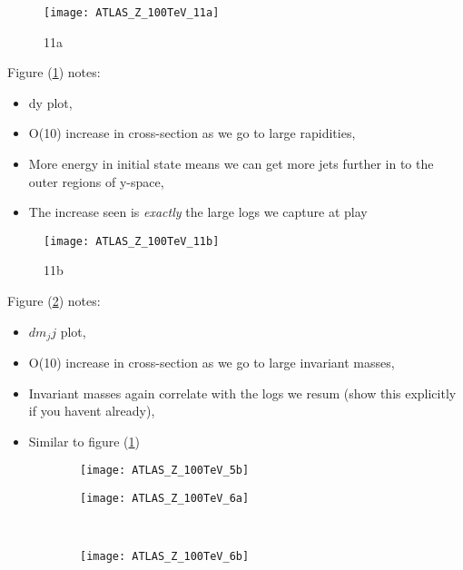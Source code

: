 	\begin{figure}[h]
		\centering
		\texttt{[image: ATLAS\_Z\_100TeV\_11a]}
		\caption{11a}
		\label{fig:100tev_11a}
	\end{figure}

	Figure (\ref{fig:100tev_11a}) notes:

	\begin{itemize}
		\item dy plot,
		\item O(10) increase in cross-section as we go to large rapidities,
		\item More energy in initial state means we can get more jets further in to the outer regions of y-space,
		\item The increase seen is \emph{exactly} the large logs we capture at play
	\end{itemize}

	\begin{figure}[h]
		\centering
		\texttt{[image: ATLAS\_Z\_100TeV\_11b]}
		\caption{11b}
		\label{fig:100tev_11b}
	\end{figure}

	Figure (\ref{fig:100tev_11b}) notes:

	\begin{itemize}
		\item $dm_jj$ plot,
		\item O(10) increase in cross-section as we go to large invariant masses,
		\item Invariant masses again correlate with the logs we resum (show this explicitly if you havent already),
		\item Similar to figure (\ref{fig:100tev_11a})
	\end{itemize}

	\begin{figure}[h]
		\centering
		\begin{subfigure}[b]{0.48\textwidth}
			\texttt{[image: ATLAS\_Z\_100TeV\_5b]}
			\caption{}
			\label{fig:100tev_5b}
		\end{subfigure}

		\begin{subfigure}[b]{0.48\textwidth}
			\texttt{[image: ATLAS\_Z\_100TeV\_6a]}
			\caption{}
			\label{fig:100tev_6a}
		\end{subfigure}
		~
		\begin{subfigure}[b]{0.48\textwidth}
			\texttt{[image: ATLAS\_Z\_100TeV\_6b]}
			\caption{}
			\label{fig:100tev_6b}
		\end{subfigure}
		\caption{}
	\end{figure}

